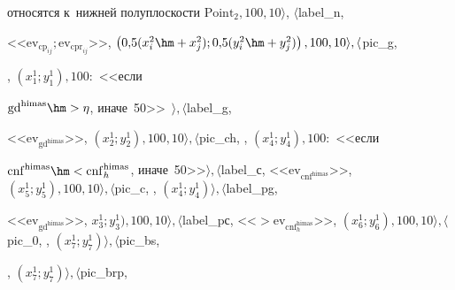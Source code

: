 относятся к~нижней полуплоскости $\mathrm{Point}_2, 100, 10\rangle$, $\langle$label\_n, 

<<$\mathrm{ev}_{\mathrm{cp}_{ij}}; \mathrm{ev}_{\mathrm{cpr}_{ij}}$>>, $\left( 0{,}5(x_i^2\hm+ x_j^2); 0{,}5 

(y_i^2\hm+ y_j^2)\right), 100, 10\rangle, \langle$pic\_g,  

  , $(x_1^1; y_1^1), 100:$ <<если 

$\mathrm{gd}^{\mathrm{himas}}\hm>\eta$, иначе~50>>~$\rangle, \langle$label\_g, 

<<$\mathrm{ev}_{\mathrm{gd}^{\mathrm{himas}}}$>>, $(x_2^1; y_2^1), 100, 10\rangle, 

\langle$pic\_ch, , $(x_4^1; y_4^1), 100:$ <<если 

$\mathrm{cnf}^{\mathrm{himas}} \hm< \mathrm{cnf}_h^{\mathrm{himas}}$, иначе~50>>$\rangle, 

\langle$label\_с, <<$\mathrm{ev}_{\mathrm{cnf}^{\mathrm{himas}}}$>>, $(x_5^1; y_5^1), 100, 

10\rangle, \langle$pic\_c, , $(x_4^1; y_4^1)\rangle, \langle$label\_pg, 

<<$\mathrm{ev}_{\mathrm{gd}^{\mathrm{himas}}}$>>, $x_3^1; y_3^1), 100, 10\rangle, 

\langle$label\_pс, <<$> \mathrm{ev}_{\mathrm{cnf}_h^{\mathrm{himas}}}$>>, $(x_6^1; y_6^1), 100, 

10\rangle, \langle$pic\_0, , $(x_7^1; y_7^1)\rangle, \langle $pic\_bs, 

  , $(x_7^1; y_7^1)\rangle, \langle$pic\_brp, 

